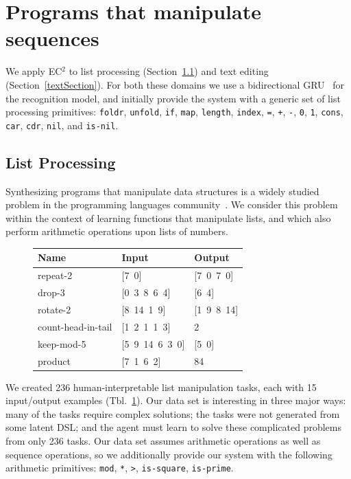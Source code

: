 \documentclass{article}
\newcommand{\system}{\textsc{EC$^2$} }
\newcommand{\code}[1]{{\footnotesize\texttt{#1}}}
\begin{document}
\section{Programs that manipulate sequences}\label{sequences}
We apply \system to list processing (Section~\ref{listSection}) and text editing (Section~\ref{textSection}).
For both these domains we use a bidirectional GRU~\cite{cho2014learning} for
the recognition model, and initially provide the system with a generic set
of list processing primitives:
\code{foldr}, \code{unfold}, \code{if}, \code{map}, \code{length},
\code{index}, \code{=}, \code{+}, \code{-}, \code{0}, \code{1}, \code{cons},
\code{car}, \code{cdr}, \code{nil}, and \code{is-nil}.

\vspace{0.5cm}

\subsection{List Processing}\label{listSection}
Synthesizing programs that manipulate data structures is a widely studied
problem in the programming languages community~\cite{feser2015synthesizing}.
We consider this problem within the context of learning functions that
manipulate lists, and which also perform arithmetic operations upon lists of numbers.


\begin{figure}\centering
  \begin{tabular}{lll}
    \toprule
    Name & Input & Output \\\midrule
    repeat-2 & [7\, 0] & [7\, 0\, 7\, 0] \\
    drop-3 & [0\, 3\, 8\, 6\, 4] & [6\, 4] \\
    rotate-2 & [8\, 14\, 1\, 9] & [1\, 9\, 8\, 14] \\
    count-head-in-tail & [1\, 2\, 1\, 1\, 3] & 2 \\
    keep-mod-5 & [5\, 9\, 14\, 6\, 3\, 0] & [5\, 0] \\
    product & [7\, 1\, 6\, 2] & 84 \\
    \bottomrule
  \end{tabular}
  \label{listexamples}
\end{figure}
We created 236 human-interpretable list manipulation tasks, each with 15
input/output examples (Tbl.~\ref{listexamples}).
Our data set is interesting in three major ways: many of the tasks require
complex solutions; the tasks were not generated from some latent DSL; and
the agent must learn to solve these complicated problems from only 236
tasks.
Our data set assumes arithmetic operations as well as sequence operations,
so we additionally provide our system with the following arithmetic
primitives: \code{mod}, \code{*}, \code{>}, \code{is-square},
\code{is-prime}.
\end{document}
